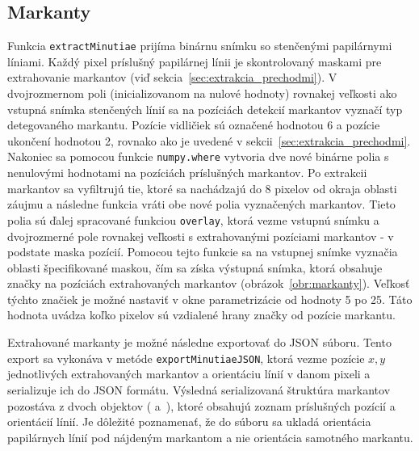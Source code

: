   \subsection{Markanty} \label{sec:markanty_algo}
  Funkcia \texttt{extractMinutiae} prijíma binárnu snímku so stenčenými papilárnymi líniami. Každý pixel príslušný papilárnej línii je skontrolovaný
  maskami pre extrahovanie markantov (viď sekcia~{\ref{sec:extrakcia_prechodmi}}). V dvojrozmernom poli (inicializovanom na nulové hodnoty) rovnakej veľkosti
  ako vstupná snímka stenčených línií sa na pozíciách detekcií markantov vyznačí typ detegovaného markantu. Pozície vidličiek sú označené hodnotou 6 a pozície
  ukončení hodnotou 2, rovnako ako je uvedené v sekcii~{\ref{sec:extrakcia_prechodmi}}. Nakoniec sa pomocou funkcie \texttt{numpy.where} vytvoria dve nové
  binárne polia s nenulovými hodnotami na pozíciách príslušných markantov. Po extrakcii markantov sa vyfiltrujú tie, ktoré sa nachádzajú do 8 pixelov od okraja
  oblasti záujmu a následne funkcia vráti obe nové polia vyznačených markantov. Tieto polia sú ďalej
  spracované funkciou \texttt{overlay}, ktorá vezme vstupnú snímku a dvojrozmerné pole rovnakej veľkosti s extrahovanými pozíciami markantov -
  v podstate maska pozícií. Pomocou tejto funkcie sa na vstupnej snímke vyznačia oblasti špecifikované maskou, čím sa získa výstupná snímka, ktorá obsahuje
  značky na pozíciách extrahovaných markantov (obrázok~{\ref{obr:markanty}}). Veľkosť týchto značiek je možné nastaviť v okne parametrizácie od hodnoty
  5 po 25. Táto hodnota uvádza koľko pixelov sú vzdialené hrany značky od pozície markantu.

  Extrahované markanty je možné následne exportovať do JSON súboru. Tento export sa vykonáva v metóde \texttt{exportMinutiaeJSON}, ktorá vezme pozície
  $x, y$ jednotlivých extrahovaných markantov a orientáciu línií v danom pixeli a serializuje ich do JSON formátu. Výsledná serializovaná štruktúra markantov
  pozostáva z dvoch objektov ( a~{}), ktoré obsahujú zoznam príslušných pozícií a orientácií línií. Je dôležité poznamenať,
  že do súboru sa ukladá orientácia papilárnych línií pod nájdeným markantom a nie orientácia samotného markantu.

